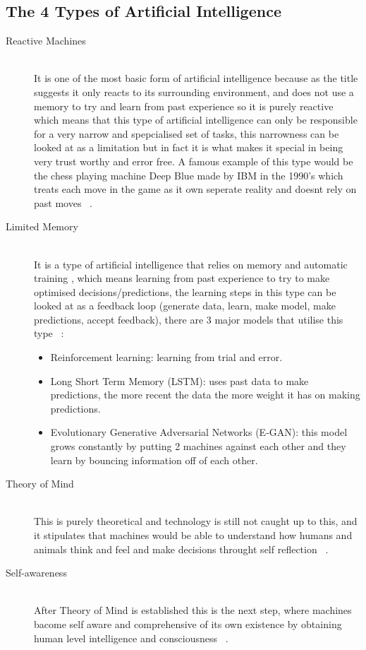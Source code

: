    \subsection{The 4 Types of Artificial Intelligence}
        \begin{description} 
        \item[Reactive Machines] \hfill \\
            It is one of the most basic form of artificial intelligence because as the title suggests it only reacts to its surrounding environment, and does not use a memory to try and learn from past experience so it is purely reactive which means that this type of artificial intelligence can only be responsible for a very narrow and spepcialised set of tasks, this narrowness can be looked at as a limitation but in fact it is what makes it special in being very trust worthy and error free. A famous example of this type would be the chess playing machine Deep Blue made by IBM in the 1990's which treats each move in the game as it own seperate reality and doesnt rely on past moves ~\cite{ai}.
        \item[Limited Memory] \hfill \\
            It is a type of artificial intelligence that relies on memory and automatic training , which means learning from past experience to try to make optimised decisions/predictions, the learning steps in this type can be looked at as a feedback loop (generate data, learn, make model, make predictions, accept feedback), there are 3 major models that utilise this type ~\cite{ai}: 
            \begin{itemize}
                \item Reinforcement learning: learning from trial and error.
                \item Long Short Term Memory (LSTM):  uses past data to make predictions, the more recent the data the more weight it has on making predictions.
                \item Evolutionary Generative Adversarial Networks (E-GAN):  this model grows constantly by putting 2 machines against each other and they learn by bouncing information off of each other. 
            \end{itemize}
        \item[Theory of Mind] \hfill \\
            This is purely theoretical and technology is still not caught up to this, and it stipulates that machines would be able to understand how humans and animals think and feel and make decisions throught self reflection ~\cite{ai}.
        \item[Self-awareness] \hfill \\
            After Theory of Mind is established this is the next step, where machines bacome self aware and comprehensive of its own existence by obtaining human level intelligence and consciousness ~\cite{ai}.
        \end{description}
    
